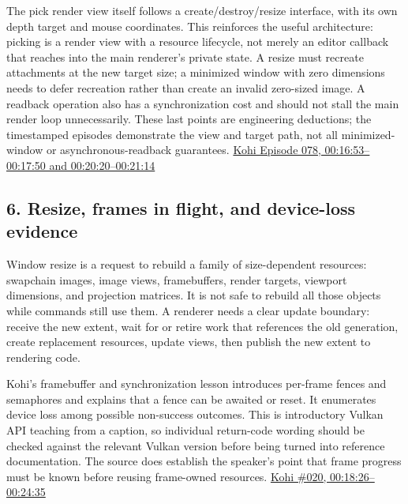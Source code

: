 The pick render view itself follows a create/destroy/resize interface, with its own depth target and mouse coordinates. This reinforces the useful architecture: picking is a render view with a resource lifecycle, not merely an editor callback that reaches into the main renderer's private state. A resize must recreate attachments at the new target size; a minimized window with zero dimensions needs to defer recreation rather than create an invalid zero-sized image. A readback operation also has a synchronization cost and should not stall the main render loop unnecessarily. These last points are engineering deductions; the timestamped episodes demonstrate the view and target path, not all minimized-window or asynchronous-readback guarantees. \href{https://www.youtube.com/watch?v=mx1TyxNFrdo&t=16m53s}{Kohi Episode 078, 00:16:53--00:17:50 and 00:20:20--00:21:14}

\subsection{6. Resize, frames in flight, and device-loss evidence}\label{06-engine-ii-ch041-resize-frames-in-flight-and-device-loss-evidence}

\hypertarget{06-engine-ii-ch041-resize-frames-in-flight-and-device-loss-evidence}{}

Window resize is a request to rebuild a family of size-dependent resources: swapchain images, image views, framebuffers, render targets, viewport dimensions, and projection matrices. It is not safe to rebuild all those objects while commands still use them. A renderer needs a clear update boundary: receive the new extent, wait for or retire work that references the old generation, create replacement resources, update views, then publish the new extent to rendering code.

Kohi's framebuffer and synchronization lesson introduces per-frame fences and semaphores and explains that a fence can be awaited or reset. It enumerates device loss among possible non-success outcomes. This is introductory Vulkan API teaching from a caption, so individual return-code wording should be checked against the relevant Vulkan version before being turned into reference documentation. The source does establish the speaker's point that frame progress must be known before reusing frame-owned resources. \href{https://www.youtube.com/watch?v=Is6CwlsaCFE&t=18m26s}{Kohi \#020, 00:18:26--00:24:35}

